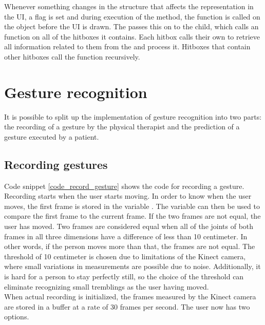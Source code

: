 Whenever something changes in the  structure that affects the representation in the UI, a flag is set and during execution of the   method, the  function is called on the  object before the UI is drawn. The  passes this on to the  child, which calls an  function on all of the hitboxes it contains. Each hitbox calls their own  to retrieve all information related to them from the  and process it. Hitboxes that contain other hitboxes call the  function recursively.


\section{Gesture recognition}

It is possible to split up the implementation of gesture recognition into two parts: the recording of a gesture by the physical therapist and the prediction of a gesture executed by a patient.


\subsection{Recording gestures}

Code snippet \ref{code_record_gesture} shows the code for recording a gesture. Recording starts when the user starts moving. In order to know when the user moves, the first frame is stored in the variable . The variable can then be used to compare the first frame to the current frame. If the two frames are not equal, the user has moved. Two frames are considered equal when all of the joints of both frames in all three dimensions have a difference of less than 10 centimeter. In other words, if the person moves more than that, the frames are not equal. The threshold of 10 centimeter is chosen due to limitations of the Kinect camera, where small variations in measurements are possible due to noise. Additionally, it is hard for a person to stay perfectly still, so the choice of the threshold can eliminate recognizing small tremblings as the user having moved.\\

When actual recording is initialized, the frames measured by the Kinect camera are stored in a buffer at a rate of 30 frames per second. The user now has two options.\\

